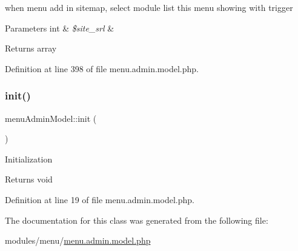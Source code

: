 when menu add in sitemap, select module list this menu showing with trigger 


\begin{DoxyParams}[1]{Parameters}
int & {\em \$site\+\_\+srl} & \\
\hline
\end{DoxyParams}
\begin{DoxyReturn}{Returns}
array 
\end{DoxyReturn}


Definition at line 398 of file menu.\+admin.\+model.\+php.

\mbox{\label{classmenuAdminModel_a092a0da21ac0c7f76f84ec5be5eea1b7}} 
\subsubsection{\texorpdfstring{init()}{init()}}
{\footnotesize\ttfamily menu\+Admin\+Model\+::init (\begin{DoxyParamCaption}{ }\end{DoxyParamCaption})}

Initialization \begin{DoxyReturn}{Returns}
void 
\end{DoxyReturn}


Definition at line 19 of file menu.\+admin.\+model.\+php.



The documentation for this class was generated from the following file\+:\begin{DoxyCompactItemize}
\item 
modules/menu/\hyperlink{menu_8admin_8model_8php}{menu.\+admin.\+model.\+php}\end{DoxyCompactItemize}
